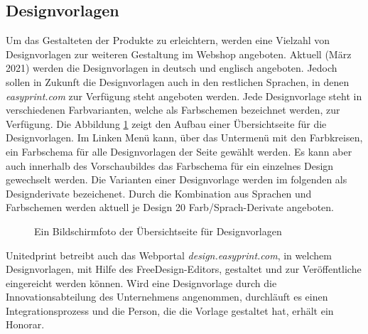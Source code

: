 \subsection{Designvorlagen}
\label{sect:Designvorlagen}
Um das Gestalteten der Produkte zu erleichtern, werden eine Vielzahl von Designvorlagen zur weiteren Gestaltung im Webshop angeboten. 
Aktuell (März 2021) werden die Designvorlagen in deutsch und englisch angeboten. Jedoch sollen in Zukunft die Designvorlagen auch in den restlichen Sprachen, in denen \emph{easyprint.com} zur Verfügung steht angeboten werden. 
Jede Designvorlage steht in verschiedenen Farbvarianten, welche als Farbschemen bezeichnet werden, zur Verfügung. Die Abbildung \ref{fig:Designuebersichtseite} zeigt den Aufbau einer Übersichtseite für die Designvorlagen. Im Linken Menü kann, über das Untermenü mit den Farbkreisen, ein Farbschema für alle Designvorlagen der Seite gewählt werden. Es kann aber auch innerhalb des Vorschaubildes das Farbschema für ein einzelnes Design gewechselt werden.
Die Varianten einer Designvorlage werden im folgenden als Designderivate bezeichenet. 
Durch die Kombination aus Sprachen und Farbschemen werden aktuell je Design 20 Farb/Sprach-Derivate angeboten.
\begin{center}
\end{center}

\begin{figure}[H]
    \centering
    \caption{Ein Bildschirmfoto der Übersichtseite für Designvorlagen}
    \label{fig:Designuebersichtseite}
\end{figure}

Unitedprint betreibt auch das Webportal \emph{design.easyprint.com}, in welchem Designvorlagen, mit Hilfe des FreeDesign-Editors, gestaltet und zur Veröffentliche eingereicht werden können. Wird eine Designvorlage durch die Innovationsabteilung des Unternehmens angenommen, durchläuft es einen Integrationsprozess und die Person, die die Vorlage gestaltet hat, erhält ein Honorar.


